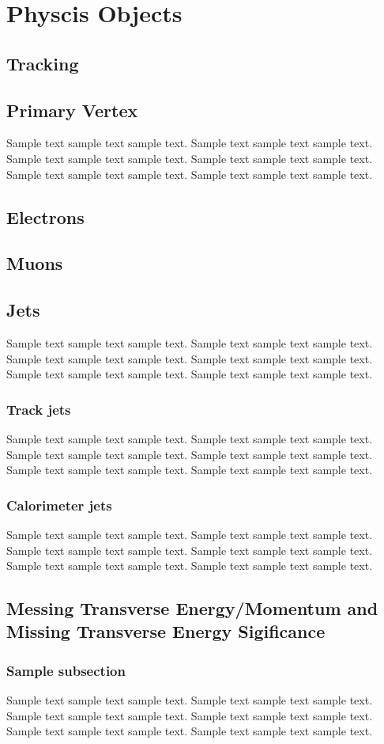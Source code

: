 \chapter{Physcis Objects}

\label{ch:objects}

\section{Tracking}
\section{Primary Vertex}
Sample text sample text sample text. Sample text sample text sample text.
Sample text sample text sample text. Sample text sample text sample text.
Sample text sample text sample text. Sample text sample text sample text.

\section{Electrons}
\section{Muons}
\section{Jets}
Sample text sample text sample text. Sample text sample text sample text.
Sample text sample text sample text. Sample text sample text sample text.
Sample text sample text sample text. Sample text sample text sample text.
\subsection{Track jets}
Sample text sample text sample text. Sample text sample text sample text.
Sample text sample text sample text. Sample text sample text sample text.
Sample text sample text sample text. Sample text sample text sample text.

\subsection{Calorimeter jets}
Sample text sample text sample text. Sample text sample text sample text.
Sample text sample text sample text. Sample text sample text sample text.
Sample text sample text sample text. Sample text sample text sample text.

\section{Messing Transverse Energy/Momentum and Missing Transverse Energy Sigificance}

\subsection{Sample subsection}
Sample text sample text sample text. Sample text sample text sample text.
Sample text sample text sample text. Sample text sample text sample text.
Sample text sample text sample text. Sample text sample text sample text.

